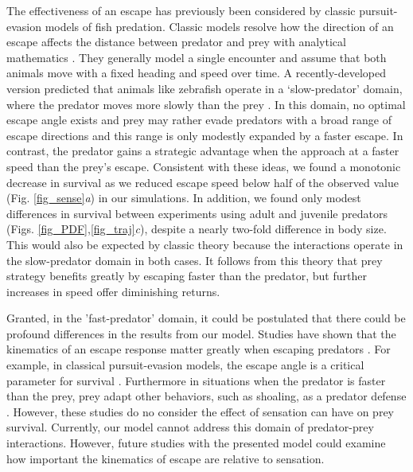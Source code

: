 \documentclass[]{rsos}%
\begin{document}
The effectiveness of an escape has previously been considered by classic pursuit-evasion models of fish predation.
Classic models resolve how the direction of an escape affects the distance between predator and prey with analytical mathematics \cite{Isaacs:1965uz,Weihs:1984tb}. 
They generally model a single encounter and assume that both animals move with a fixed heading and speed over time. 
A recently-developed version predicted that animals like zebrafish operate in a `slow-predator' domain, where the predator moves more slowly than the prey \cite{Soto:2015cj}.
In this domain, no optimal escape angle exists and prey may rather evade predators with a broad range of escape directions and this range is only modestly expanded by a faster escape. 
In contrast, the predator gains a strategic advantage when the approach at a faster speed than the prey's escape\cite{Weihs:1984tb}. 
Consistent with these ideas, we found a monotonic decrease in survival as we reduced escape speed below half of the observed value (Fig. \ref{fig_sense}\textit{a}) in our simulations. 
In addition, we found only modest differences in survival between experiments using adult and juvenile predators (Figs. \ref{fig_PDF},\ref{fig_traj}\textit{c}), despite a nearly two-fold difference in body size.
This would also be expected by classic theory because the interactions operate in the slow-predator domain in both cases.
It follows from this theory that prey strategy benefits greatly by escaping faster than the predator, but further increases in speed offer diminishing returns.

Granted, in the 'fast-predator' domain, it could be postulated that there could be profound differences in the results from our model.
Studies have shown that the kinematics of an escape response matter greatly when escaping predators \cite{Howland:1974ud, Domenici:2001gj}.
For example, in classical pursuit-evasion models, the escape angle is a critical parameter for survival \cite{Weihs:1984tb}.
Furthermore in situations when the predator is faster than the prey, prey adapt other behaviors, such as shoaling, as a predator defense \cite{pitcher:1986}.
However, these studies do no consider the effect of sensation can have on prey survival.
Currently, our model cannot address this domain of predator-prey interactions.
However, future studies with the presented model could examine how  important the kinematics of escape are relative to sensation.
\end{document}
